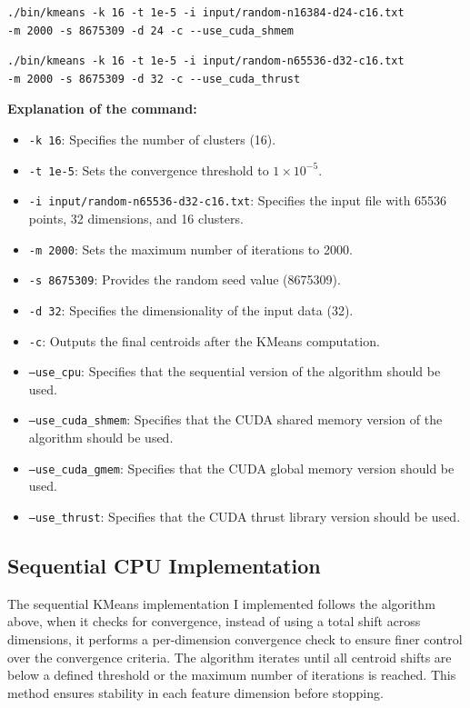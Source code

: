\documentclass[letterpaper,12pt]{article}
\theoremstyle{remark}
\begin{document}
\begin{verbatim}
./bin/kmeans -k 16 -t 1e-5 -i input/random-n16384-d24-c16.txt 
-m 2000 -s 8675309 -d 24 -c --use_cuda_shmem
\end{verbatim}

\begin{verbatim}
./bin/kmeans -k 16 -t 1e-5 -i input/random-n65536-d32-c16.txt 
-m 2000 -s 8675309 -d 32 -c --use_cuda_thrust
\end{verbatim}

\textbf{Explanation of the command:}
\begin{itemize}
    \item \texttt{-k 16}: Specifies the number of clusters (16).
    \item \texttt{-t 1e-5}: Sets the convergence threshold to $1 \times 10^{-5}$.
    \item \texttt{-i input/random-n65536-d32-c16.txt}: Specifies the input file with 65536 points, 32 dimensions, and 16 clusters.
    \item \texttt{-m 2000}: Sets the maximum number of iterations to 2000.
    \item \texttt{-s 8675309}: Provides the random seed value (8675309).
    \item \texttt{-d 32}: Specifies the dimensionality of the input data (32).
    \item \texttt{-c}: Outputs the final centroids after the KMeans computation.
    \item \texttt{--use\_cpu}: Specifies that the sequential version of the algorithm should be used.
    \item \texttt{--use\_cuda\_shmem}: Specifies that the CUDA shared memory version of the algorithm should be used.
    \item \texttt{--use\_cuda\_gmem}: Specifies that the CUDA global memory version should be used.
    \item \texttt{--use\_thrust}: Specifies that the CUDA thrust library version should be used.

\end{itemize}

\clearpage
\subsection{Sequential CPU Implementation}
The sequential KMeans implementation I implemented follows the algorithm above, when it checks for convergence, instead of using a total shift across dimensions, it performs a per-dimension convergence check to ensure finer control over the convergence criteria. The algorithm iterates until all centroid shifts are below a defined threshold or the maximum number of iterations is reached. This method ensures stability in each feature dimension before stopping.
\end{document}
